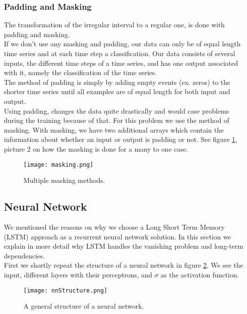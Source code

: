 \subsubsection{Padding and Masking}
The transformation of the irregular interval to a regular one, is done with padding and masking. \\

If we don't use any masking and padding, our data can only be of equal length time series and at each time step a classification. Our data consists of several inputs, the different time steps of a time series, and has one output associated with it, namely the classification of the time series. \\

The method of padding is simply by adding empty events (ex. zeros) to the shorter time series until all examples are of equal length for both input and output. \\
Using padding, changes the data quite drastically and would case problems during the training because of that. For this problem we use the method of masking. With masking, we have two additional arrays which contain the information about whether an input or output is padding or not. See figure \ref{fig:masking}, picture $2$ on how the masking is done for a many to one case.

\begin{figure}[H]
	\centering
	\texttt{[image: masking.png]}
	\caption{Multiple masking methods.}
	\label{fig:masking}
\end{figure} 



\subsection{Neural Network}
\label{sec:nn}

We mentioned the reasons on why we choose a Long Short Term Memory (LSTM) approach as a recurrent neural network solution. In this section we explain in more detail why LSTM handles the vanishing problem and long-term dependencies. \\

First we shortly repeat the structure of a neural network in figure \ref{fig:nnStructure}. We see the input, different layers with their perceptrons, and $\sigma$ as the activation function. 

\begin{figure}[H]
	\centering
	\texttt{[image: nnStructure.png]}
	\caption{A general structure of a neural network.}
	\label{fig:nnStructure}
\end{figure} 

